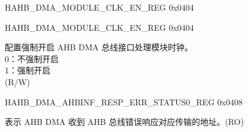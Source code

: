 {\begin{register}{H}{AHB\_DMA\_MODULE\_CLK\_EN\_REG} {0x0404}
\begin{regdesc}
\begin{reglist}
    \item [见下页...]
    \end{reglist}\end{regdesc}
    \end{register}

    \addtocounter{Regfloat}{-1}
    \begin{register}{H}{AHB\_DMA\_MODULE\_CLK\_EN\_REG} {0x0404}
    \begin{regdesc}\begin{reglist}
    \item [接上页...]
    \item
    \label{fielddesc:AHBDMAAHBINFCLKEN}\item [AHB\_DMA\_AHBINF\_CLK\_EN] 配置强制开启 AHB DMA 总线接口处理模块时钟。\\
    0：不强制开启\\
    1：强制开启\\ (R/W)
    \end{reglist}\end{regdesc}
    \end{register}


    \begin{register}{H}{AHB\_DMA\_AHBINF\_RESP\_ERR\_STATUS0\_REG} {0x0408}\label{regdesc:AHBDMAAHBINFRESPERRSTATUS0REG}
    \regnewline%
    \begin{regdesc}\begin{reglist}
    \label{fielddesc:AHBDMAAHBINFRESPERRADDR}\item [AHB\_DMA\_AHBINF\_RESP\_ERR\_ADDR] 表示 AHB DMA 收到 AHB 总线错误响应对应传输的地址。(RO)
    \end{reglist}\end{regdesc}
    \end{register}


}
